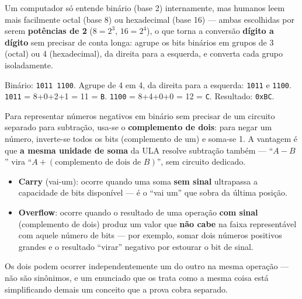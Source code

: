 \begin{conceito}
Um computador só entende binário (base 2) internamente, mas humanos leem
mais facilmente octal (base 8) ou hexadecimal (base 16) --- ambas
escolhidas por serem \textbf{potências de 2} ($8=2^3$, $16=2^4$), o que
torna a conversão \textbf{dígito a dígito} sem precisar de conta longa:
agrupe os bits binários em grupos de 3 (octal) ou 4 (hexadecimal), da
direita para a esquerda, e converta cada grupo isoladamente.
\end{conceito}

\begin{exemplo}
Binário: \texttt{1011 1100}. Agrupe de 4 em 4, da direita para a esquerda:
\texttt{1011} e \texttt{1100}. \texttt{1011} = 8+0+2+1 = 11 = \texttt{B}.
\texttt{1100} = 8+4+0+0 = 12 = \texttt{C}. Resultado: \texttt{0xBC}.
\end{exemplo}

\begin{conceito}
Para representar números negativos em binário sem precisar de um circuito
separado para subtração, usa-se o \textbf{complemento de dois}: para negar
um número, inverte-se todos os bits (complemento de um) e soma-se 1. A
vantagem é que \textbf{a mesma unidade de soma} da ULA resolve subtração
também --- “$A - B$” vira “$A + (\text{complemento de dois de } B)$”, sem
circuito dedicado.
\end{conceito}

\begin{conceito}
\begin{itemize}
\item \textbf{Carry} (vai-um): ocorre quando uma soma \textbf{sem sinal}
ultrapassa a capacidade de bits disponível --- é o “vai um” que sobra da
última posição.
\item \textbf{Overflow}: ocorre quando o resultado de uma operação
\textbf{com sinal} (complemento de dois) produz um valor que \textbf{não
cabe} na faixa representável com aquele número de bits --- por exemplo,
somar dois números positivos grandes e o resultado “virar” negativo por
estourar o bit de sinal.
\end{itemize}
Os dois podem ocorrer independentemente um do outro na mesma operação ---
não são sinônimos, e um enunciado que os trata como a mesma coisa está
simplificando demais um conceito que a prova cobra separado.
\end{conceito}

